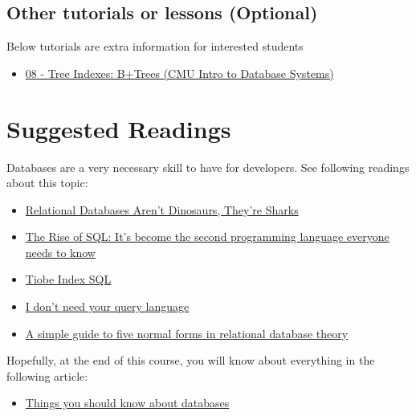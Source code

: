\documentclass[
  letterpaper,
  DIV=11,
  numbers=noendperiod]{scrreprt}
\providecommand{\tightlist}{%
  \setlength{\itemsep}{0pt}\setlength{\parskip}{0pt}}\usepackage{longtable,booktabs,array}
\begin{document}
\section{Other tutorials or lessons
(Optional)}\label{other-tutorials-or-lessons-optional}

Below tutorials are extra information for interested students

\begin{itemize}
\tightlist
\item
  \href{https://www.youtube.com/watch?v=scUtG_6M_lU}{08 - Tree Indexes:
  B+Trees (CMU Intro to Database Systems)}
\end{itemize}


\chapter{Suggested Readings}\label{suggested-readings}

Databases are a very necessary skill to have for developers. See
following readings about this topic:

\begin{itemize}
\item
  \href{https://www.simplethread.com/relational-databases-arent-dinosaurs-theyre-sharks/}{Relational
  Databases Aren't Dinosaurs, They're Sharks}
\item
  \href{https://spectrum.ieee.org/the-rise-of-sql}{The Rise of SQL: It's
  become the second programming language everyone needs to know}
\item
  \href{https://www.tiobe.com/tiobe-index/sql/}{Tiobe Index SQL}
\item
  \href{https://antonz.org/fancy-ql/}{I don't need your query language}
\item
  \href{../reference-documents/1983_A\%20simple\%20guide\%20to\%20five\%20normal\%20forms\%20in\%20relational\%20database\%20theory_Annotated.pdf}{A
  simple guide to five normal forms in relational database theory}
\end{itemize}

Hopefully, at the end of this course, you will know about everything in
the following article:

\begin{itemize}
\tightlist
\item
  \href{https://architecturenotes.co/things-you-should-know-about-databases/}{Things
  you should know about databases}
\end{itemize}
\end{document}
